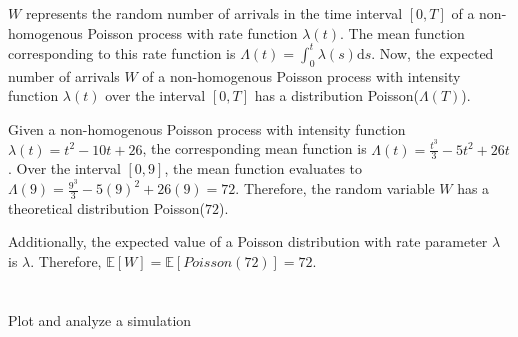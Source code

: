 \documentclass[11pt, oneside]{article}   	%
\begin{document}
\section{}
$W$ represents the random number of arrivals in the time interval $[0, T]$ of a non-homogenous Poisson process with rate function $\lambda(t)$. The mean function corresponding to this rate function is $\Lambda(t) = \int_{0}^{t}\lambda(s)\mathrm{d}s $. Now, the expected number of arrivals $W$ of a non-homogenous Poisson process with intensity function $\lambda(t)$ over the interval $[0, T]$ has a distribution Poisson($\Lambda(T)$). 

Given a non-homogenous Poisson process with intensity function $\lambda(t)=t^2-10t+26$, the corresponding mean function is $\Lambda(t)=\frac{t^3}{3}-5t^2+26t$. Over the interval $[0,9]$, the mean function evaluates to $\Lambda(9)=\frac{9^3}{3} - 5(9)^2+26(9) = 72$. Therefore, the random variable $W$ has a theoretical distribution Poisson($72$).

Additionally, the expected value of a Poisson distribution with rate parameter $\lambda$ is $\lambda$. Therefore, $\mathbb{E}[W]=\mathbb{E}[Poisson(72)]=72$.

\section{}
Plot and analyze a simulation
\end{document}
